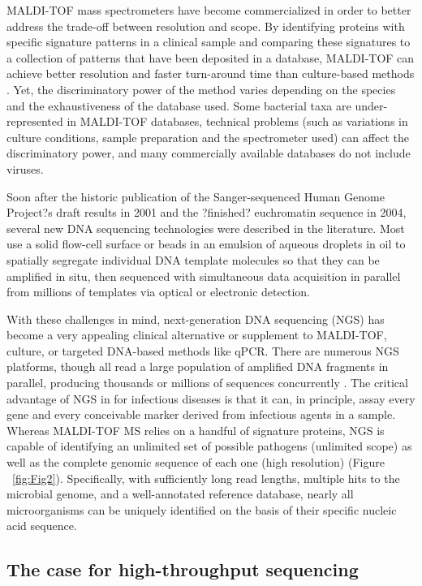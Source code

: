 MALDI-TOF mass spectrometers have become commercialized in order to better address the trade-off between resolution and scope. By identifying proteins with specific signature patterns in a clinical sample and comparing these signatures  to a collection of patterns that have been deposited in a database, MALDI-TOF can achieve better resolution and faster turn-around time than culture-based methods \cite{Fox:2014fj}. Yet, the discriminatory power of the method varies depending on the species and the exhaustiveness of the database used. Some bacterial taxa are under-represented in MALDI-TOF databases, technical problems (such as variations in culture conditions, sample preparation and the spectrometer used) can affect the discriminatory power, and many commercially available databases do not include viruses. 

Soon after the historic publication of the Sanger-sequenced Human Genome Project?s draft results in 2001 and the ?finished? euchromatin sequence in 2004, several new DNA sequencing technologies were described in the literature. Most use a solid flow-cell surface or beads in an emulsion of aqueous droplets in oil to spatially segregate individual DNA template molecules so that they can be amplified in situ, then sequenced with simultaneous data acquisition in parallel from millions of templates via optical or electronic detection.

With these challenges in mind, next-generation DNA sequencing (NGS) has become a very appealing clinical alternative or supplement to MALDI-TOF, culture, or targeted DNA-based methods like qPCR. There are numerous NGS platforms, though all read a large population of amplified DNA fragments in parallel, producing thousands or millions of sequences concurrently \cite{Shendure:2012et}. The critical advantage of NGS in for infectious diseases is that it can, in principle, assay every gene and every conceivable marker derived from infectious agents in a sample. Whereas MALDI-TOF MS relies on a handful of signature proteins, NGS is capable of identifying an unlimited set of possible pathogens (unlimited scope) as well as the complete genomic sequence of each one (high resolution) (Figure ~\ref{fig:Fig2}). Specifically, with sufficiently long read lengths, multiple hits to the microbial genome, and a well-annotated reference database, nearly all microorganisms can be uniquely identified on the basis of their specific nucleic acid sequence. 

\subsection{The case for high-throughput sequencing}

